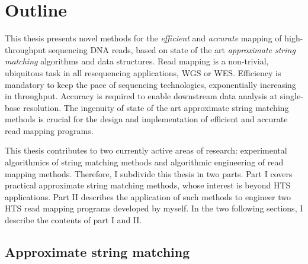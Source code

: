 


\section{Outline}
\label{sec:intro:outline}

This thesis presents novel methods for the \emph{efficient} and \emph{accurate} mapping of high-through\-put sequencing DNA reads, based on state of the art \emph{approximate string matching} algorithms and data structures.
Read mapping is a non-trivial, ubiquitous task in all resequencing applications, \eg WGS or WES.
Efficiency is mandatory to keep the pace of sequencing technologies, exponentially increasing in throughput.
Accuracy is required to enable downstream data analysis at single-base resolution.
The ingenuity of state of the art approximate string matching methods is crucial for the design and implementation of efficient and accurate read mapping programs.

This thesis contributes to two currently active areas of research: experimental algorithmics of string matching methods and algorithmic engineering of read mapping methods.
Therefore, I subdivide this thesis in two parts.
Part I covers practical approximate string matching methods, whose interest is beyond HTS applications.
Part II describes the application of such methods to engineer two HTS read mapping programs developed by myself.
In the two following sections, I describe the contents of part I and II.

\subsection{Approximate string matching}


